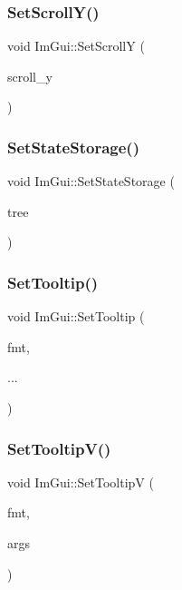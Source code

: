 \subsubsection{\texorpdfstring{Set\+Scroll\+Y()}{SetScrollY()}}
{\footnotesize\ttfamily void Im\+Gui\+::\+Set\+ScrollY (\begin{DoxyParamCaption}\item[{float}]{scroll\+\_\+y }\end{DoxyParamCaption})}

\hypertarget{namespace_im_gui_a635f4511603cc6284d8b21fb8d53090d}{}\label{namespace_im_gui_a635f4511603cc6284d8b21fb8d53090d} 
\subsubsection{\texorpdfstring{Set\+State\+Storage()}{SetStateStorage()}}
{\footnotesize\ttfamily void Im\+Gui\+::\+Set\+State\+Storage (\begin{DoxyParamCaption}\item[{\hyperlink{struct_im_gui_storage}{Im\+Gui\+Storage} $\ast$}]{tree }\end{DoxyParamCaption})}

\hypertarget{namespace_im_gui_a313073fa01b8a9791f241ef93091ce92}{}\label{namespace_im_gui_a313073fa01b8a9791f241ef93091ce92} 
\subsubsection{\texorpdfstring{Set\+Tooltip()}{SetTooltip()}}
{\footnotesize\ttfamily void Im\+Gui\+::\+Set\+Tooltip (\begin{DoxyParamCaption}\item[{const char $\ast$}]{fmt,  }\item[{}]{... }\end{DoxyParamCaption})}

\hypertarget{namespace_im_gui_a3826acf68fc4a12bb66401575f51d6a2}{}\label{namespace_im_gui_a3826acf68fc4a12bb66401575f51d6a2} 
\subsubsection{\texorpdfstring{Set\+Tooltip\+V()}{SetTooltipV()}}
{\footnotesize\ttfamily void Im\+Gui\+::\+Set\+TooltipV (\begin{DoxyParamCaption}\item[{const char $\ast$}]{fmt,  }\item[{va\+\_\+list}]{args }\end{DoxyParamCaption})}

